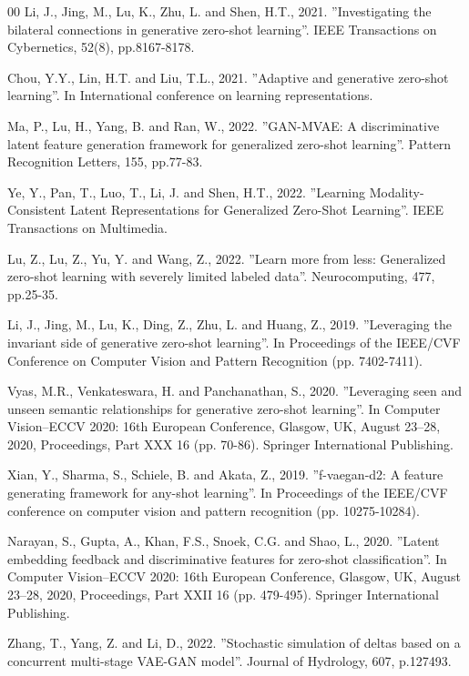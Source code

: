 \documentclass{article}
\begin{document}
\begin{thebibliography}{00}
 Li, J., Jing, M., Lu, K., Zhu, L. and Shen, H.T., 2021. ''Investigating the bilateral connections in generative zero-shot learning''. IEEE Transactions on Cybernetics, 52(8), pp.8167-8178.

 Chou, Y.Y., Lin, H.T. and Liu, T.L., 2021. ''Adaptive and generative zero-shot learning''. In International conference on learning representations.

 Ma, P., Lu, H., Yang, B. and Ran, W., 2022. ''GAN-MVAE: A discriminative latent feature generation framework for generalized zero-shot learning''. Pattern Recognition Letters, 155, pp.77-83.

 Ye, Y., Pan, T., Luo, T., Li, J. and Shen, H.T., 2022. ''Learning Modality-Consistent Latent Representations for Generalized Zero-Shot Learning''. IEEE Transactions on Multimedia.

 Lu, Z., Lu, Z., Yu, Y. and Wang, Z., 2022. ''Learn more from less: Generalized zero-shot learning with severely limited labeled data''. Neurocomputing, 477, pp.25-35.

 Li, J., Jing, M., Lu, K., Ding, Z., Zhu, L. and Huang, Z., 2019. ''Leveraging the invariant side of generative zero-shot learning''. In Proceedings of the IEEE/CVF Conference on Computer Vision and Pattern Recognition (pp. 7402-7411).

 Vyas, M.R., Venkateswara, H. and Panchanathan, S., 2020. ''Leveraging seen and unseen semantic relationships for generative zero-shot learning''. In Computer Vision–ECCV 2020: 16th European Conference, Glasgow, UK, August 23–28, 2020, Proceedings, Part XXX 16 (pp. 70-86). Springer International Publishing.

 Xian, Y., Sharma, S., Schiele, B. and Akata, Z., 2019. ''f-vaegan-d2: A feature generating framework for any-shot learning''. In Proceedings of the IEEE/CVF conference on computer vision and pattern recognition (pp. 10275-10284).

 Narayan, S., Gupta, A., Khan, F.S., Snoek, C.G. and Shao, L., 2020. ''Latent embedding feedback and discriminative features for zero-shot classification''. In Computer Vision–ECCV 2020: 16th European Conference, Glasgow, UK, August 23–28, 2020, Proceedings, Part XXII 16 (pp. 479-495). Springer International Publishing.

 Zhang, T., Yang, Z. and Li, D., 2022. ''Stochastic simulation of deltas based on a concurrent multi-stage VAE-GAN model''. Journal of Hydrology, 607, p.127493.


\end{thebibliography}
\end{document}
